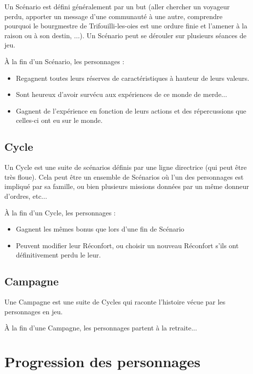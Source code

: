 \documentclass[a4paper,10pt,twoside,twocolumn,openany,bg=print]{dndbook}
\begin{document}
Un Scénario est défini généralement par un but (aller chercher un voyageur perdu, apporter un message d'une communauté à une autre, comprendre pourquoi le bourgmestre de Trifouilli-les-oies est une ordure finie et l'amener à la raison ou à son destin, ...). Un Scénario peut se dérouler sur plusieurs séances de jeu.

À la fin d'un Scénario, les personnages :

\begin{itemize}
	\item Regagnent toutes leurs réserves de caractéristiques à hauteur de leurs valeurs.
	\item Sont heureux d'avoir survécu aux expériences de ce monde de merde...
	\item Gagnent de l'expérience en fonction de leurs actions et des répercussions que celles-ci ont eu sur le monde.
\end{itemize}

\subsection*{Cycle}

Un Cycle est une suite de scénarios définis par une ligne directrice (qui peut être très floue). Cela peut être un ensemble de Scénarios où l'un des personnages est impliqué par sa famille, ou bien plusieurs missions données par un même donneur d'ordres, etc...

À la fin d'un Cycle, les personnages :

\begin{itemize}
	\item Gagnent les mêmes bonus que lors d'une fin de Scénario
	\item Peuvent modifier leur Réconfort, ou choisir un nouveau Réconfort s'ils ont définitivement perdu le leur.
\end{itemize}

\subsection*{Campagne}

Une Campagne est une suite de Cycles qui raconte l'histoire vécue par les personnages en jeu.

À la fin d'une Campagne, les personnages partent à la retraite...

\section{Progression des personnages}
\end{document}
